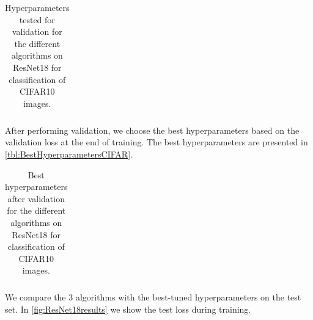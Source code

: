\documentclass[a4paper,11pt,oneside]{report}
\begin{document}
\begin{table}
    \begin{center}
        \begin{tabular}{||c | c | l||}
             \hline
             
        \end{tabular}
    \end{center}
    \caption{Hyperparameters tested for validation for the different algorithms on ResNet18 for classification of CIFAR10 images.
    }
    \label{tbl:ChoicesHyperparametersCIFAR}
\end{table}

After performing validation, we choose the best hyperparameters based on the validation loss at the end of training. The best hyperparameters are presented in \autoref{tbl:BestHyperparametersCIFAR}.

\begin{table}
    \begin{center}
        \begin{tabular}{||c | c | l||}
             \hline
             
        \end{tabular}
    \end{center}
    \caption{Best hyperparameters after validation for the different algorithms on ResNet18 for classification of CIFAR10 images.
    }
    \label{tbl:BestHyperparametersCIFAR}
\end{table}

We compare the 3 algorithms with the best-tuned hyperparameters on the test set. In \autoref{fig:ResNet18results} we show the test loss during training. 
\end{document}
